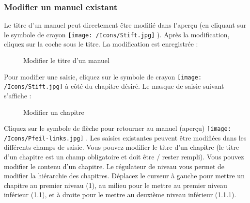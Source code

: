 \subsubsection{Modifier un manuel existant}

Le titre d'un manuel peut directement être modifié dans l'aperçu (en cliquant sur le symbole de crayon \texttt{[image: /Icons/Stift.jpg]} ). Après la modification, cliquez sur la coche sous le titre. La modification est enregistrée :

\begin{figure}[H]
\caption{Modifier le titre d'un manuel}
\end{figure}

Pour modifier une saisie, cliquez sur le symbole de crayon \texttt{[image: /Icons/Stift.jpg]} à côté du chapitre désiré. Le masque de saisie suivant s'affiche :

\begin{figure}[H]
\caption{Modifier un chapitre}
\end{figure}

Cliquez sur le symbole de flèche pour retourner au manuel (aperçu) \texttt{[image: /Icons/Pfeil-links.jpg]} . Les saisies existantes peuvent être modifiées dans les différents champs de saisie. Vous pouvez modifier le titre d'un chapitre  (le titre d'un chapitre est un champ obligatoire et doit être / rester rempli). Vous pouvez modifier le contenu  d'un chapitre. Le régulateur de niveau  vous permet de modifier la hiérarchie des chapitres. Déplacez le curseur à gauche pour mettre un chapitre au premier niveau (1), au milieu pour le mettre au premier niveau inférieur (1.1), et à droite pour le mettre au deuxième niveau inférieur (1.1.1). \\

